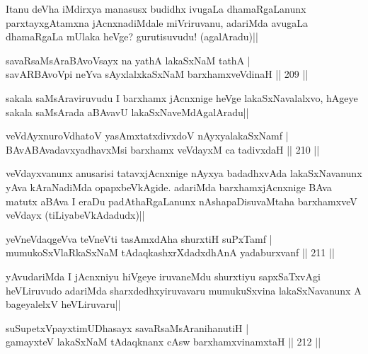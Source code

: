 \begin{artha}
Itanu deVha iMdirxya manasusx budidhx ivugaLa dhamaRgaLanunx parxtayxgAtamxna jAcnxnadiMdale miVriruvanu, adariMda avugaLa dhamaRgaLa mUlaka heVge? gurutisuvudu! (agalAradu)||
\end{artha}

\begin{shl}
savaRsaMsAraBAvoV\s sayx na yathA lakaSxNaM tathA |\\
savARBAvoV\s pi neYva sAyxlalxkaSxNaM barxhamxveVdinaH \hfill || 209 ||
\end{shl}

\begin{artha}
sakala saMsAraviruvudu I barxhamx jAcnxnige heVge lakaSxNavalalxvo, hAgeye sakala saMsArada aBAvavU lakaSxNaveMdAgalAradu||
\end{artha}


\begin{shl}
veVdAyxnuroVdhatoV yasAmxtatxdivxdoV nAyxyalakaSxNamf |\\
BAvABAvadavxyadhavxMsi barxhamx veVdayxM ca tadivxdaH \hfill || 210 ||
\end{shl}

\begin{artha}
veVdayxvanunx anusarisi tatavxjAcnxnige nAyxya badadhxvAda lakaSxNavanunx yAva kAraNadiMda opapxbeVkAgide. adariMda barxhamxjAcnxnige BAva matutx aBAva I eraDu padAthaRgaLanunx nAshapaDisuvaMtaha barxhamxveV veVdayx (tiLiyabeVkAdadudx)||
\end{artha}

\begin{shl}
yeVneVdaqgeVva teVneVti tasAmxdAha shurxtiH suPxTamf |\\
mumukoSxVlaRkaSxNaM tAdaqkashxrXdadxdhAnA yadaburxvanf \hfill || 211 ||
\end{shl}

\begin{artha}
yAvudariMda I jAcnxniyu hiVgeye iruvaneMdu shurxtiyu sapxSaTxvAgi heVLiruvudo adariMda sharxdedhxyiruvavaru mumukuSxvina lakaSxNavanunx A bageyalelxV heVLiruvaru||
\end{artha}%


\begin{shl}
suSupetxV\s payxtimUDhasayx savaRsaMsAranihanutiH |\\
gamayxteV lakaSxNaM tAdaqknanx cAsw barxhamxvinamxtaH \hfill || 212 ||
\end{shl}

